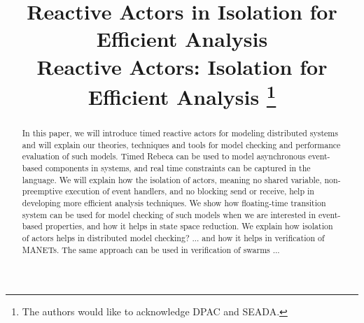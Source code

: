 \documentclass[conference]{IEEEtran}
\begin{document}
	
	\title{Reactive Actors in Isolation for Efficient Analysis 
	\\ Reactive Actors: Isolation for Efficient Analysis 
		\thanks{The authors would like to acknowledge DPAC and SEADA.}
	}
	
	\author{
		\and
		\and
	}
	
	\maketitle
	
	\begin{abstract}
		In this paper, we will introduce timed reactive actors for modeling distributed systems and will explain our theories, techniques and tools for model checking and performance evaluation of such models. Timed Rebeca can be used to model asynchronous event-based components in systems, and real time constraints can be captured in the language. We will explain how the isolation of actors, meaning no shared variable, non-preemptive execution of event handlers, and no blocking send or receive, help in developing more efficient analysis techniques. We show how floating-time transition system can be used for model checking of such models when we are interested in event-based properties, and how it helps in state space reduction. We explain how isolation of actors helps in distributed model checking? ... and how it helps in verification of MANETs. The same approach can be used in verification of swarms ...
		
	\end{abstract}
	
\end{document}
